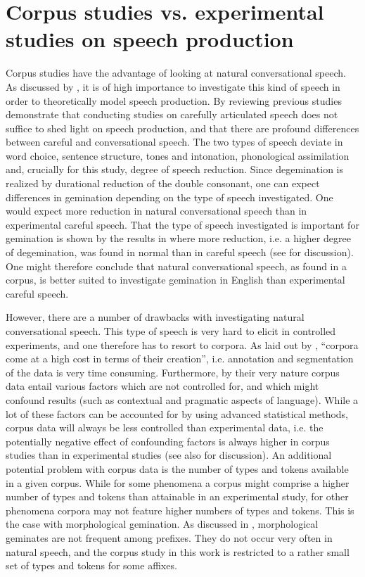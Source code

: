 \section{Corpus studies vs. experimental studies on speech production} \label{corpus and experimental studies}


Corpus studies have the advantage of looking at natural conversational speech. As discussed by \cite{Tucker.2016}, it is of high importance to investigate this kind of speech in order to theoretically model speech production.  By reviewing previous studies \cite{Tucker.2016} demonstrate that conducting studies on carefully articulated speech does not suffice to shed light on speech production, and that there are profound differences between careful and conversational speech. The two types of speech deviate in word choice, sentence structure, tones and intonation, phonological assimilation and, crucially for this study, degree of speech reduction. Since degemination is realized by durational reduction of the double consonant, one can expect differences in gemination depending on the type of speech investigated. One would expect more reduction in natural conversational speech than in experimental careful speech. That the type of speech investigated is important for gemination is shown by the results in \cite{Oh.2012} where more reduction, i.e. a higher degree of degemination, was found in normal than in careful speech (see  for discussion). One might therefore conclude that natural conversational speech, as found in a corpus, is better suited to investigate gemination in English than experimental careful speech.

However, there are a number of drawbacks with investigating natural conversational speech. This type of speech is very hard to elicit in controlled experiments, and one therefore has to resort to corpora. As laid out by \citet[21]{Tucker.2016}, ``corpora come at a high cost in terms of their creation'', i.e. annotation and segmentation of the data is very time consuming. 
Furthermore, by their very nature corpus data entail various factors which are not controlled for, and which might confound results (such as contextual and pragmatic aspects of language). While a lot of these factors can be accounted for by using advanced statistical methods, corpus data will always be less controlled than experimental data, i.e. the potentially negative effect of confounding factors is always higher in corpus studies than in experimental studies (see also \citet[144]{Kunter.13.04.2017} for discussion).
An additional potential problem with corpus data is the number of types and tokens available in a given corpus. While for some phenomena a corpus might comprise a higher number of types and tokens than attainable in an experimental study, for other phenomena corpora may not feature higher numbers of types and tokens. This is the case with morphological gemination. As discussed in , morphological geminates are not frequent among prefixes. They do not occur very often in natural speech, and the corpus study in this work is restricted to a rather small set of types and tokens for some affixes. 

